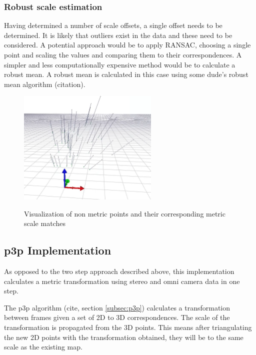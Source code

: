 

\subsubsection{Robust scale estimation}

Having determined a number of scale offsets, a single offset needs to be determined.  It is likely that outliers exist in the data and these need to be considered.  A potential approach would be to apply RANSAC, choosing a single point and scaling the values and comparing them to their correspondences.  A simpler and less computationally expensive method would be to calculate a robust mean.  A robust mean is calculated in this case using some dude's robust mean algorithm (citation).


\begin{figure}[H]
  \centering
    \includegraphics[width=0.6\textwidth]{chapters/images/scale_matches}\\
  \caption{Visualization of non metric points and their corresponding metric scale matches}
  \label{fig:circular_match}
\end{figure}

\subsection{p3p Implementation}

As opposed to the two step approach described above, this implementation calculates a metric transformation using stereo and omni camera data in one step.

The p3p algorithm (cite, section \ref{subsec:p3p}) calculates a transformation between frames given a set of 2D to 3D correspondences.  The scale of the transformation is propagated from the 3D points.  This means after triangulating the new 2D points with the transformation obtained, they will be to the same scale as the existing map.

